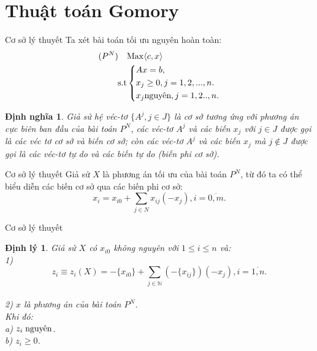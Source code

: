 \documentclass[10pt]{beamer}
\newtheorem{dn}{Định nghĩa}[section]
\newtheorem{dl}{Định lý}[section]
\begin{document}
\section*{Thuật toán Gomory}
    \begin{frame}{Cơ sở lý thuyết}
        Ta xét bài toán tối ưu nguyên hoàn toàn:\\
\begin{equation}\label{Gomory1}
     \begin{split}
      (P^N) \quad    & {\rm{Max}} \langle c,x \rangle\\
          \rm{s.t} &\left\{\begin{split}
            & Ax= b,\\
           & x_j \ge 0, j=1,2,...,n.\\
            & x_j \text{nguyên}, j=1,2..,n.\\
           \end{split}\right.
       \end{split}
   \end{equation}
   \begin{dn}
     Giả  sử hệ véc-tơ $\{A^j,j\in J\}$ là cơ sở tương ứng với phương án cực biên ban đầu của bài toán $P^N$, các véc-tơ $A^j$ và các biến $x_j$ với $j\in J$ được gọi là các véc tơ cơ sở và biến cơ sở; còn các véc-tơ $A^j$ và các biến $x_j$ mà $j \notin J$ được gọi là các véc-tơ tự do và các biến tự do (biến phi cơ sở).\\  
   \end{dn}
    \end{frame}

    \begin{frame}{Cơ sở lý thuyết}
         Giả sử $X$ là phương án  tối ưu của bài toán $P^N$, từ đó ta có thể biểu diễn các biến cơ sở qua các biến phi cơ sở:\\
   \begin{equation}\label{2.4}
       x_{i}=x_{i0} + \sum_{j \in N} x_{ij}(-x_j), i=\overline{0,m}.
   \end{equation}
    \end{frame}

    \begin{frame}{Cơ sở lý thuyết}
        \begin{dl}
        Giả sử $X$ có $x_{i0}$ không nguyên với $1\le i\le n$ và:\\
        1)\begin{equation}\label{2.5}
            z_i\equiv z_i(X)= -\{x_{i0}\} + \sum_{j \in \mathbb {N} }(-\{x_{ij}\})(-x_{j}), i=\overline{1,n}.
        \end{equation} \\
        2) $x$ là phương án của bài toán $P^N$.\\
        Khi đó:\\
        a) $z_i \hspace{0.1cm} \text{nguyên}$.\\
        b) $z_i \ge 0$. 
        \end{dl}
    \end{frame}
\end{document}
